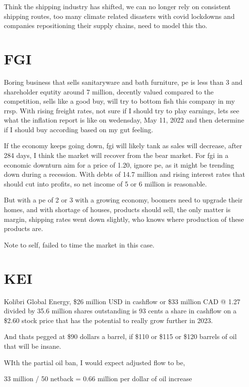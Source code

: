 Think the shipping industry has shifted, we can no longer rely on consistent shipping routes, too many climate related disasters with covid lockdowns and companies repositioning their supply chains, need to model this tho.

\section{FGI}

Boring business that sells sanitaryware and bath furniture, pe is less than 3 and shareholder equtity around 7 million, decently valued compared to the competition, sells like a good buy, will try to bottom fish this company in my rrsp. With rising freight rates, not sure if I should try to play earnings, lets see what the inflation report is like on wedensday, May 11, 2022 and then determine if I should buy according based on my gut feeling.

If the economy keeps going down, fgi will likely tank as sales will decrease, after 284 days, I think the market will recover from the bear market. For fgi in a economic downturn aim for a price of 1.20, ignore pe, as it might be trending down during a recession. With debts of 14.7 million and rising interest rates that should cut into profits, so net income of 5 or 6 million is reasonable.

But with a pe of 2 or 3 with a growing economy, boomers need to upgrade their homes, and with shortage of houses, products should sell, the only matter is margin, shipping rates went down slightly, who knows where production of these products are.

Note to self, failed to time the market in this case.

\section{KEI}

Kolibri Global Energy, \$26 million USD in cashflow or \$33 million CAD @ 1.27 divided by 35.6 million shares outstanding is 93 cents a share in cashflow on a \$2.60 stock price that has the potential to really grow further in 2023. 

And thats pegged at \$90 dollars a barrel, if \$110 or \$115 or \$120 barrels of oil that will be insane.


WIth the partial oil ban, I would expect adjusted flow to be, 


33 million / 50 netback = 0.66 million per dollar of oil increase

